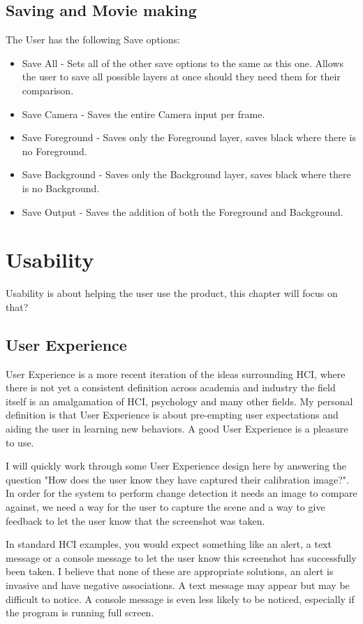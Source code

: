 \documentclass[a4paper]{report}
\begin{document}
\section{Saving and Movie making}
The User has the following Save options:

\begin{itemize}
\item Save All - Sets all of the other save options to the same as this one. Allows the user to save all possible layers at once should they need them for their comparison.
\item Save Camera - Saves the entire Camera input per frame.
\item Save Foreground - Saves only the Foreground layer, saves black where there is no Foreground.
\item Save Background - Saves only the Background layer, saves black where there is no Background.
\item Save Output - Saves the addition of both the Foreground and Background.
\end{itemize}

\chapter{Usability}
Usability is about helping the user use the product, this chapter will focus on that?

\section{User Experience}
User Experience is a more recent iteration of the ideas surrounding HCI, where there is not yet a consistent definition across academia and industry the field itself is an amalgamation of HCI, psychology and many other fields. My personal definition is that User Experience is about pre-empting user expectations and aiding the user in learning new behaviors. A good User Experience is a pleasure to use. 

I will quickly work through some User Experience design here by answering the question "How does the user know they have captured their calibration image?". In order for the system to perform change detection it needs an image to compare against, we need a way for the user to capture the scene and a way to give feedback to let the user know that the screenshot was taken.

In standard HCI examples, you would expect something like an alert, a text message or a console message to let the user know this screenshot has successfully been taken. I believe that none of these are appropriate solutions, an alert is invasive and have negative associations. A text message may appear but may be difficult to notice. A console message is even less likely to be noticed, especially if the program is running full screen.
\end{document}
